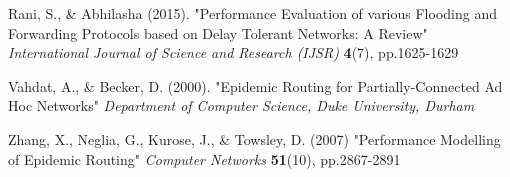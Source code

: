 \documentclass{article}
\begin{document}
\begin{thebibliography}{20}
Rani, S., \& Abhilasha (2015).
"Performance Evaluation of various Flooding and
Forwarding Protocols based on Delay Tolerant
Networks: A Review"
\textit{International Journal of Science and Research (IJSR)} \textbf{4}(7), pp.1625-1629

Vahdat, A., \& Becker, D. (2000).
"Epidemic Routing for Partially-Connected Ad Hoc Networks"
\textit{Department of Computer Science, Duke University, Durham}

Zhang, X., Neglia, G., Kurose, J., \& Towsley, D. (2007)
"Performance Modelling of Epidemic Routing"
\textit{Computer Networks} \textbf{51}(10), pp.2867-2891

\end{thebibliography}
 
\end{document}
